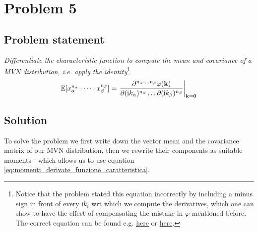 \documentclass[a4paper]{article}
\let\temp\phi%
\let\phi\varphi
\let\varphi\temp
\renewcommand{\i}{\mathrm{i}} %
\begin{document}
\section{Problem 5}
\subsection{Problem statement}
\textit{Differentiate the characteristic function to compute the mean and covariance of a MVN distribution, i.e. apply the identity}\footnote{Notice that the problem stated this equation incorrectly by including a minus sign in front of every $\i k_i$ wrt which we compute the derivatives, which one can show to have the effect of compensating the mistake in $\phi$ mentioned before. The correct equation can be found e.g. \href{https://www.statlect.com/fundamentals-of-probability/joint-characteristic-function}{here} or \href{https://en.m.wikipedia.org/wiki/Characteristic_function_(probability_theory)}{here}.}
\begin{equation}
    \label{eq:momenti_derivate_funzione_caratteristica}
    \mathbb{E}[x_\alpha^{n_\alpha}\cdot\dots\cdot x_\beta^{n_\beta}] = %
    \eval{\frac{\partial^{n_\alpha\cdot\dots n_\beta} \phi(\vb{k})}{\partial(\i k_\alpha)^{n_\alpha}\dots\partial(\i k_\beta)^{n_\beta}}}_{\vb{k} = \vb{0}} %
\end{equation}


\subsection{Solution}
To solve the problem we first write down the vector mean and the covariance matrix of our MVN distribution, then we rewrite their components as suitable moments - which allows us to use equation \eqref{eq:momenti_derivate_funzione_caratteristica}.
\end{document}
